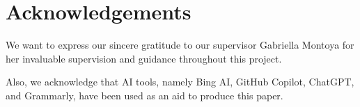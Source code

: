 \section{Acknowledgements}\label{sec:acknowledgements}
We want to express our sincere gratitude to our supervisor Gabriella Montoya for her invaluable supervision and guidance throughout this project.

Also, we acknowledge that AI tools, namely Bing AI, GitHub Copilot, ChatGPT, and Grammarly, have been used as an aid to produce this paper.